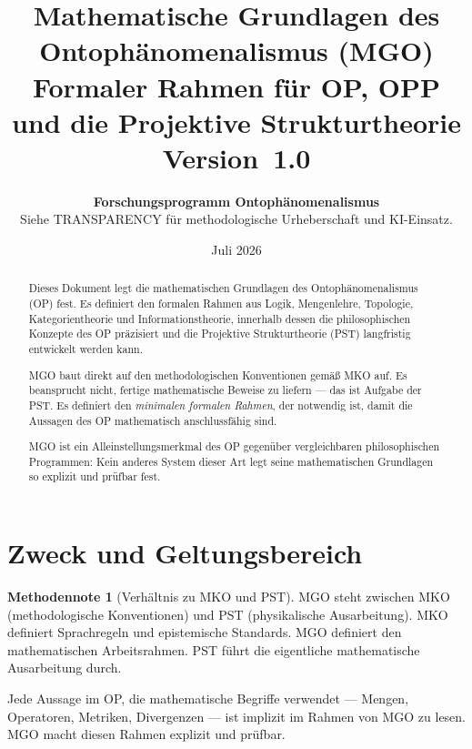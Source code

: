 \documentclass[11pt,a4paper]{article}
\title{
  \textbf{Mathematische Grundlagen des Ontoph\"{a}nomenalismus (MGO)}\\[0.4em]
  {\large Formaler Rahmen f\"{u}r OP, OPP und die Projektive Strukturtheorie}\\[0.5em]
  {\normalsize Version~1.0}
}
\author{
  \textbf{Forschungsprogramm Ontoph\"{a}nomenalismus}\\
  \small Siehe TRANSPARENCY f\"{u}r methodologische Urheberschaft und KI-Einsatz.
}
\date{Juli 2026}
\theoremstyle{plain}
\theoremstyle{definition}
\newtheorem{methodennote}{Methodennote}[section]
\begin{document}
\maketitle

\begin{abstract}
Dieses Dokument legt die mathematischen Grundlagen des Ontoph\"{a}nomenalismus (OP)
fest. Es definiert den formalen Rahmen aus Logik, Mengenlehre, Topologie,
Kategorientheorie und Informationstheorie, innerhalb dessen die philosophischen
Konzepte des OP pr\"{a}zisiert und die Projektive Strukturtheorie (PST) langfristig
entwickelt werden kann.

MGO baut direkt auf den methodologischen Konventionen gem\"{a}\ss{} MKO auf. Es
beansprucht nicht, fertige mathematische Beweise zu liefern --- das ist Aufgabe der PST.
Es definiert den \emph{minimalen formalen Rahmen}, der notwendig ist, damit die
Aussagen des OP mathematisch anschlussfähig sind.

MGO ist ein Alleinstellungsmerkmal des OP gegen\"{u}ber vergleichbaren philosophischen
Programmen: Kein anderes System dieser Art legt seine mathematischen Grundlagen so
explizit und pr\"{u}fbar fest.
\end{abstract}

\tableofcontents
\newpage

\section{Zweck und Geltungsbereich}

\begin{methodennote}[Verh\"{a}ltnis zu MKO und PST]
MGO steht zwischen MKO (methodologische Konventionen) und PST (physikalische
Ausarbeitung). MKO definiert Sprachregeln und epistemische Standards. MGO definiert
den mathematischen Arbeitsrahmen. PST f\"{u}hrt die eigentliche mathematische
Ausarbeitung durch.

Jede Aussage im OP, die mathematische Begriffe verwendet --- Mengen, Operatoren,
Metriken, Divergenzen --- ist implizit im Rahmen von MGO zu lesen. MGO macht diesen
Rahmen explizit und pr\"{u}fbar.
\end{methodennote}
\end{document}
